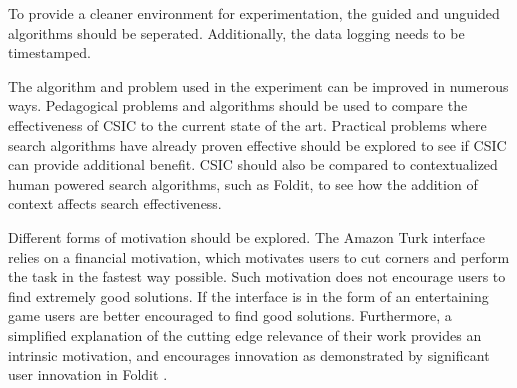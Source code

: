 To provide a cleaner environment for experimentation, the guided and unguided algorithms should be seperated.  Additionally, the data logging needs to be timestamped.

The algorithm and problem used in the experiment can be improved in numerous ways.  Pedagogical problems and algorithms should be used to compare the effectiveness of CSIC to the current state of the art.  Practical problems where search algorithms have already proven effective should be explored to see if CSIC can provide additional benefit.  CSIC should also be compared to contextualized human powered search algorithms, such as Foldit, to see how the addition of context affects search effectiveness.  

Different forms of motivation should be explored.  The Amazon Turk interface relies on a financial motivation, which motivates users to cut corners and perform the task in the fastest way possible.  Such motivation does not encourage users to find extremely good solutions.  If the interface is in the form of an entertaining game users are better encouraged to find good solutions.  Furthermore, a simplified explanation of the cutting edge relevance of their work provides an intrinsic motivation, and encourages innovation as demonstrated by significant user innovation in Foldit \citep{moore12:_foldit_game_leads_to_aids_resear_break}.

